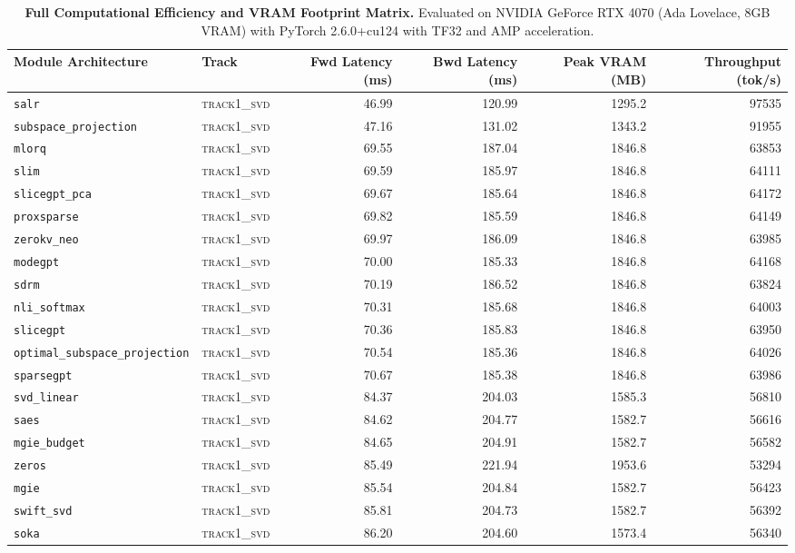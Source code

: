 \begin{table}[t]
\centering
\small
\caption{\textbf{Full Computational Efficiency and VRAM Footprint Matrix.} Evaluated on NVIDIA GeForce RTX 4070 (Ada Lovelace, 8GB VRAM) with PyTorch 2.6.0+cu124 with TF32 and AMP acceleration.}
\label{tab:efficiency_benchmark_results}
\begin{tabular}{l l r r r r}
\toprule
\textbf{Module Architecture} & \textbf{Track} & \textbf{Fwd Latency (ms)} & \textbf{Bwd Latency (ms)} & \textbf{Peak VRAM (MB)} & \textbf{Throughput (tok/s)} \\
\midrule
\texttt{salr} & \textsc{track1\_svd} & 46.99 & 120.99 & 1295.2 & 97535 \\
\texttt{subspace\_projection} & \textsc{track1\_svd} & 47.16 & 131.02 & 1343.2 & 91955 \\
\texttt{mlorq} & \textsc{track1\_svd} & 69.55 & 187.04 & 1846.8 & 63853 \\
\texttt{slim} & \textsc{track1\_svd} & 69.59 & 185.97 & 1846.8 & 64111 \\
\texttt{slicegpt\_pca} & \textsc{track1\_svd} & 69.67 & 185.64 & 1846.8 & 64172 \\
\texttt{proxsparse} & \textsc{track1\_svd} & 69.82 & 185.59 & 1846.8 & 64149 \\
\texttt{zerokv\_neo} & \textsc{track1\_svd} & 69.97 & 186.09 & 1846.8 & 63985 \\
\texttt{modegpt} & \textsc{track1\_svd} & 70.00 & 185.33 & 1846.8 & 64168 \\
\texttt{sdrm} & \textsc{track1\_svd} & 70.19 & 186.52 & 1846.8 & 63824 \\
\texttt{nli\_softmax} & \textsc{track1\_svd} & 70.31 & 185.68 & 1846.8 & 64003 \\
\texttt{slicegpt} & \textsc{track1\_svd} & 70.36 & 185.83 & 1846.8 & 63950 \\
\texttt{optimal\_subspace\_projection} & \textsc{track1\_svd} & 70.54 & 185.36 & 1846.8 & 64026 \\
\texttt{sparsegpt} & \textsc{track1\_svd} & 70.67 & 185.38 & 1846.8 & 63986 \\
\texttt{svd\_linear} & \textsc{track1\_svd} & 84.37 & 204.03 & 1585.3 & 56810 \\
\texttt{saes} & \textsc{track1\_svd} & 84.62 & 204.77 & 1582.7 & 56616 \\
\texttt{mgie\_budget} & \textsc{track1\_svd} & 84.65 & 204.91 & 1582.7 & 56582 \\
\texttt{zeros} & \textsc{track1\_svd} & 85.49 & 221.94 & 1953.6 & 53294 \\
\texttt{mgie} & \textsc{track1\_svd} & 85.54 & 204.84 & 1582.7 & 56423 \\
\texttt{swift\_svd} & \textsc{track1\_svd} & 85.81 & 204.73 & 1582.7 & 56392 \\
\texttt{soka} & \textsc{track1\_svd} & 86.20 & 204.60 & 1573.4 & 56340 \\
\bottomrule
\end{tabular}
\end{table}